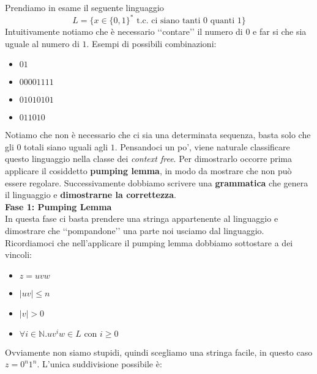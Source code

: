 \documentclass[a4paper,oneside]{scrbook}
\begin{document}
Prendiamo in esame il seguente linguaggio 
$$L=\{x\in\{0,1\}^*\text{ t.c. ci siano tanti 0 quanti 1}\}$$
Intuitivamente notiamo che è necessario ‘‘contare’’ il numero di $0$ e far si che sia uguale al numero di $1$. Esempi di possibili combinazioni:
\begin{itemize}
	\item $01$
	\item $00001111$
	\item $01010101$
	\item $011010$
\end{itemize}
Notiamo che non è necessario che ci sia una determinata sequenza, basta solo che gli $0$ totali siano uguali agli $1$.
Pensandoci un po', viene naturale classificare questo linguaggio nella classe dei \textit{context free}.
Per dimostrarlo occorre prima applicare il cosiddetto \textbf{pumping lemma}, in modo da mostrare che non può essere regolare.
Successivamente dobbiamo scrivere una \textbf{grammatica} che genera il linguaggio e \textbf{dimostrarne la correttezza}.\\
\textbf{Fase 1: Pumping Lemma}\\
In questa fase ci basta prendere una stringa appartenente al linguaggio e dimostrare che ‘‘pompandone’’ una parte noi usciamo dal linguaggio.
Ricordiamoci che nell'applicare il pumping lemma dobbiamo sottostare a dei vincoli:
\begin{itemize}
	\item $z=uvw$
	\item $|uv|\leq n$
	\item $|v|>0$
	\item $\forall i \in \mathbb{N}.uv^iw\in L \text{ con }i\geq0$
\end{itemize}
Ovviamente non siamo stupidi, quindi scegliamo una stringa facile, in questo caso $z=0^n1^n$.
L'unica suddivisione possibile è:
\begin{center}
\end{center}
\end{document}
